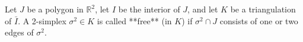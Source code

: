 Let $J$ be a polygon in $\mathbb{R}^2$, let $I$ be the interior of $J$, and let $K$ be a triangulation of $\bar{I}$. A 2-simplex $\sigma^2 \in K$ is called **free** (in $K$) if $\sigma^2 \cap J$ consists of one or two edges of $\sigma^2$.
